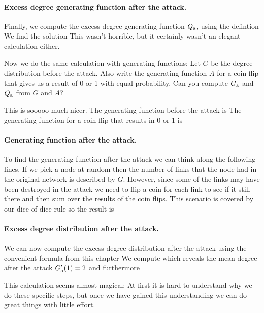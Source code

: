 \paragraph{Excess degree generating function after the attack.}Finally, we compute the excess degree generating function $Q_{\rm a}$, using the defintion
We find the solution
This wasn't horrible, but it certainly wasn't an elegant calculation either. 

\subquestion Now we do the same calculation with generating functions: Let $G$ be the degree distribution before the attack. Also write the generating function $A$ for a coin flip that gives us a result of 0 or 1 with equal probability. Can you compute $G_{\rm a}$ and $Q_{\rm a}$ from $G$ and $A$?

\solution
This is sooooo much nicer. The generating function before the attack is 
The generating function for a coin flip that results in 0 or 1 is
\paragraph{Generating function after the attack.}To find the generating function after the attack we can think along the following lines. If we pick a node at random then the number of links that the node had in the original network is described by $G$. However, since some of the links may have been destroyed in the attack we need to flip a coin for each link to see if it still there and then sum over the results of the coin flips. This scenario is covered by our dice-of-dice rule so the result is 
\paragraph{Excess degree distribution after the attack.}We can now compute the excess degree distribution after the attack using the convenient formula from this chapter
We compute 
which reveals the mean degree after the attack $G'_{\rm a}(1)=2$ and furthermore 

This calculation seems almost magical: At first it is hard to understand why we do these specific steps, but once we have gained this understanding we can do great things with little effort. 

\solutionend
